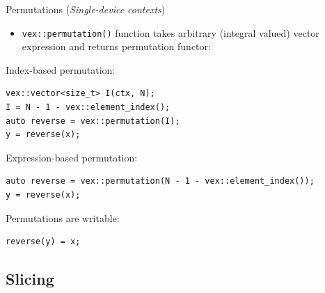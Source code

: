 \documentclass[@BEAMER_OPTIONS@]{beamer}
\newcommand{\code}[1]{\lstinline|#1|}
\newcommand{\singledevice}{\hspace{1cm}\footnotesize(\emph{Single-device contexts})}
\begin{document}
\begin{frame}[fragile]{Permutations \singledevice}
    \begin{itemize}
        \item \code{vex::permutation()} function takes arbitrary (integral
            valued) vector expression and returns permutation functor:
    \end{itemize}
    \pause
    \begin{exampleblock}{Index-based permutation:}
        \begin{lstlisting}
vex::vector<size_t> I(ctx, N);
I = N - 1 - vex::element_index();
auto reverse = vex::permutation(I);
y = reverse(x);
        \end{lstlisting}
    \end{exampleblock}
    \pause
    \begin{exampleblock}{Expression-based permutation:}
        \begin{lstlisting}
auto reverse = vex::permutation(N - 1 - vex::element_index());
y = reverse(x);
        \end{lstlisting}
    \end{exampleblock}
    \pause
    \begin{exampleblock}{Permutations are writable:}
        \begin{lstlisting}
reverse(y) = x;
        \end{lstlisting}
    \end{exampleblock}
\end{frame}

\note{ }

\subsection{Slicing}
\end{document}
